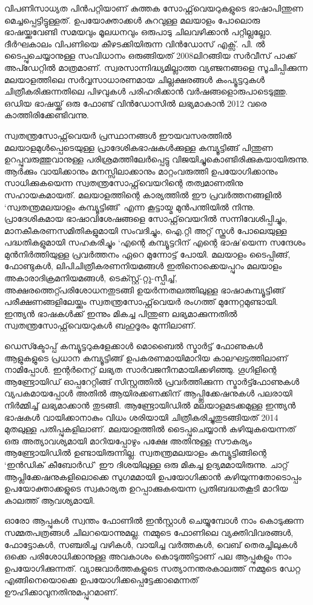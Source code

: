 \documentclass[12pt,twoside,a4paper]{article}
\begin{document}
വിപണിസാധ്യത പിൻപറ്റിയാണ് കുത്തക സോഫ്റ്റ്‌വെയറുകളുടെ ഭാഷാപിന്തുണ മെച്ചപ്പെട്ടിട്ടുള്ളത്. ഉപയോക്താക്കൾ കുറവുള്ള മലയാളം പോലൊരു ഭാഷയ്ക്കുവേണ്ടി സമയവും മൂലധനവും ഒരുപാടു ചിലവഴിക്കാൻ പറ്റില്ലല്ലോ. ദീർഘകാലം വിപണിയെ കീഴടക്കിയിരുന്ന വിൻഡോസ് എക്സ്. പി. ൽ  ടൈപ്പുചെയ്യാനുള്ള സംവിധാനം ഒരുങ്ങിയത് 2008ലിറങ്ങിയ സർവീസ് പാക്ക് അപ്ഡേറ്റിൽ മാത്രമാണ്. സ്വരസാന്നിദ്ധ്യമില്ലാത്ത വ്യഞ്ജനങ്ങളെ സൂചിപ്പിക്കുന്ന മലയാളത്തിലെ സർവ്വസാധാരണമായ ചില്ലക്ഷരങ്ങൾ കംപ്യൂട്ടറുകൾ ചിത്രീകരിക്കുന്നതിലെ പിഴവുകൾ പരിഹരിക്കാൻ വർഷങ്ങളൊരുപാടെടുത്തു. ഒഡിയ ഭാഷയ്ക്ക് ഒരു ഫോണ്ട് വിൻഡോസിൽ ലഭ്യമാകാൻ 2012 വരെ കാത്തിരിക്കേണ്ടിവന്നു.

സ്വതന്ത്രസോഫ്റ്റ്‌വെയർ പ്രസ്ഥാനങ്ങൾ ഈയവസരത്തിൽ മലയാളമുൾപ്പെടെയുള്ള പ്രാദേശികഭാഷകൾക്കുള്ള കമ്പ്യൂട്ടിങ്ങ് പിന്തുണ ഉറപ്പുവരുത്തുവാനുള്ള പരിശ്രമത്തിലേർപ്പെട്ടു വിജയിച്ചുകൊണ്ടിരിക്കുകയായിരുന്നു. ആർക്കും വായിക്കാനും മനസ്സിലാക്കാനും മാറ്റംവരുത്തി ഉപയോഗിക്കാനും സാധിക്കുകയെന്ന സ്വതന്ത്രസോഫ്റ്റ്‌വെയറിന്റെ തത്വമാണതിനു സഹായകമായത്. മലയാളത്തിന്റെ കാര്യത്തിൽ ഈ പ്രവർത്തനങ്ങളിൽ `സ്വതന്ത്രമലയാളം കമ്പ്യൂട്ടിങ്ങ്' എന്ന കൂട്ടായ്മ മുൻപന്തിയിൽ നിന്നു. പ്രാദേശികമായ ഭാഷാവിശേഷങ്ങളെ സോഫ്റ്റ്‌വെയറിൽ സന്നിവേശിപ്പിച്ചും, മാനകീകരണസമിതികളുമായി സംവദിച്ചും, ഐ.റ്റി അറ്റ് സ്കൂൾ പോലെയുള്ള പദ്ധതികളുമായി സഹകരിച്ചും  `എന്റെ കമ്പ്യൂട്ടറിന് എന്റെ ഭാഷ'യെന്ന സന്ദേശം മുൻനിർത്തിയുള്ള പ്രവർത്തനം ഏറെ മുന്നോട്ട് പോയി. മലയാളം ടൈപ്പിങ്ങ്, ഫോണ്ടുകൾ, ലിപിചിത്രീകരണനിയമങ്ങൾ ഇതിനൊക്കെയപ്പുറം മലയാളം അകാരാദിക്രമനിയമങ്ങൾ, ടെക്സ്റ്റ്-റ്റു-സ്പീച്ച്, അക്ഷരത്തെറ്റ്പരിശോധനതുടങ്ങി ഉയർന്നതലത്തിലുള്ള ഭാഷാകമ്പ്യൂട്ടിങ്ങ് പരീക്ഷണങ്ങളിലേയ്ക്കും സ്വതന്ത്രസോഫ്റ്റ്‌വെയർ രംഗത്ത് മുന്നേറ്റമുണ്ടായി. ഇന്ത്യൻ ഭാഷകൾക്ക് ഇന്നും മികച്ച പിന്തുണ ലഭ്യമാക്കുന്നതിൽ സ്വതന്ത്രസോഫ്റ്റ്‌വെയറുകൾ ബഹുദൂരം മുന്നിലാണ്.

ഡെസ്ക്ടോപ്പ് കമ്പ്യൂട്ടറുകളേക്കാൾ മൊബൈൽ സ്മാർട്ട് ഫോണുകൾ ആളുകളുടെ പ്രധാന കമ്പ്യൂട്ടിങ്ങ് ഉപകരണമായിമാറിയ കാലഘട്ടത്തിലാണ് നാമിപ്പോൾ. ഇന്റർനെറ്റ് ലഭ്യത സാർവജനീനമായിക്കഴിഞ്ഞു. ഗൂഗിളിന്റെ ആണ്ട്രോയിഡ് ഓപ്പറേറ്റിങ്ങ് സിസ്റ്റത്തിൽ പ്രവർത്തിക്കുന്ന സ്മാർട്ട്ഫോണുകൾ വ്യപകമായപ്പോൾ അതിൽ ആയിരക്കണക്കിന് ആപ്പ്ലിക്കേഷനുകൾ പലരായി നിർമ്മിച്ച് ലഭ്യമാക്കാൻ തുടങ്ങി. ആണ്ട്രോയിഡിൽ മലയാളമടക്കമുള്ള ഇന്ത്യൻ ഭാഷകൾ വായിക്കാനാകും വിധം ശരിയായി ചിത്രീകരിച്ചുതുടങ്ങിയത് 2014 മുതലുള്ള പതിപ്പുകളിലാണ്. മലയാളത്തിൽ ടൈപ്പുചെയ്യാൻ കഴിയുകയെന്നത് ഒരു അത്യാവശ്യമായി മാറിയപ്പോഴും പക്ഷേ അതിനുള്ള സൗകര്യം ആണ്ട്രോയിഡിൽ ഉണ്ടായിരുന്നില്ല. സ്വതന്ത്രമലയാളം കമ്പ്യൂട്ടിങ്ങിന്റെ `ഇൻഡിക് കീബോർഡ്' ഈ ദിശയിലുള്ള ഒരു  മികച്ച ഉദ്യമമായിരുന്നു. ചാറ്റ് ആപ്ലിക്കേഷനുകളിലൊക്കെ സുഗമമായി ഉപയോഗിക്കാൻ കഴിയുന്നതോടൊപ്പം ഉപയോക്താക്കളുടെ സ്വകാര്യത ഉറപ്പാക്കുകയെന്ന പ്രതിബദ്ധതകൂടി മാറിയ കാലത്ത് ആവശ്യമായി.

ഓരോ ആപ്പുകൾ സ്വന്തം ഫോണിൽ ഇൻസ്റ്റാൾ ചെയ്യുമ്പോൾ നാം കൊടുക്കുന്ന സമ്മതപത്രങ്ങൾ ചിലറയൊന്നുമല്ല. നമ്മുടെ ഫോണിലെ വ്യക്തിവിവരങ്ങൾ, ഫോട്ടോകൾ, സഞ്ചരിച്ച വഴികൾ, വായിച്ച വർത്തകൾ, വെബ് തെരച്ചിലുകൾ ഒക്കെ പരിശോധിക്കാനുള്ള അവകാശം കൊടുത്തിട്ടാണ് പല ആപ്പുകളും നാം ഉപയോഗിക്കുന്നത്.  വ്യാജവാർത്തകളുടെ സത്യാനന്തരകാലത്ത്  നമ്മുടെ ഡേറ്റ എങ്ങിനെയൊക്കെ ഉപയോഗിക്കപ്പെട്ടേക്കാമെന്നത് ഊഹിക്കാവുനതിനുമപ്പുറമാണ്. 
\end{document}
